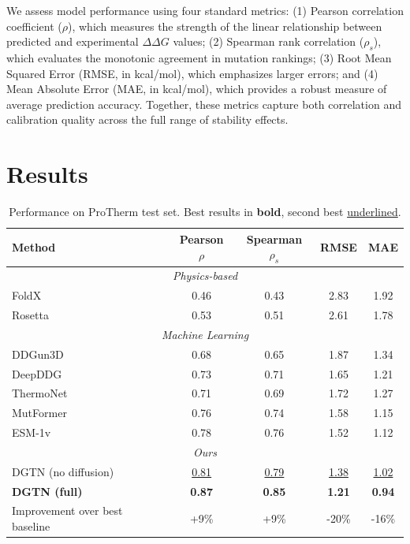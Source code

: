 \documentclass[11pt]{article}
\begin{document}

We assess model performance using four standard metrics: (1) Pearson
correlation coefficient ($\rho$), which measures the strength of the linear
relationship between predicted and experimental $\Delta \Delta G$ values; (2) Spearman rank
correlation ($\rho_s$), which evaluates the monotonic agreement in mutation
rankings; (3) Root Mean Squared Error (RMSE, in kcal/mol), which emphasizes
larger errors; and (4) Mean Absolute Error (MAE, in kcal/mol), which provides a
robust measure of average prediction accuracy.  Together, these metrics capture
both correlation and calibration quality across the full range of stability
effects.

\section{Results}

\begin{table}[htbp]
\centering
\caption{Performance on ProTherm test set. Best results in \textbf{bold}, second best \underline{underlined}.}
\label{tab:main_results}
\begin{tabular}{lcccc}
\toprule
\textbf{Method} & \textbf{Pearson} $\rho$ & \textbf{Spearman} $\rho_s$ & \textbf{RMSE} & \textbf{MAE} \\
\midrule
\multicolumn{5}{c}{\textit{Physics-based}} \\
FoldX & 0.46 & 0.43 & 2.83 & 1.92 \\
Rosetta & 0.53 & 0.51 & 2.61 & 1.78 \\
\midrule
\multicolumn{5}{c}{\textit{Machine Learning}} \\
DDGun3D & 0.68 & 0.65 & 1.87 & 1.34 \\
DeepDDG & 0.73 & 0.71 & 1.65 & 1.21 \\
ThermoNet & 0.71 & 0.69 & 1.72 & 1.27 \\
MutFormer & 0.76 & 0.74 & 1.58 & 1.15 \\
ESM-1v & 0.78 & 0.76 & 1.52 & 1.12 \\
\midrule
\multicolumn{5}{c}{\textit{Ours}} \\
DGTN (no diffusion) & \underline{0.81} & \underline{0.79} & \underline{1.38} & \underline{1.02} \\
\textbf{DGTN (full)} & \textbf{0.87} & \textbf{0.85} & \textbf{1.21} & \textbf{0.94} \\
\midrule
Improvement over best baseline & +9\% & +9\% & -20\% & -16\% \\
\bottomrule
\end{tabular}
\end{table}
\end{document}
